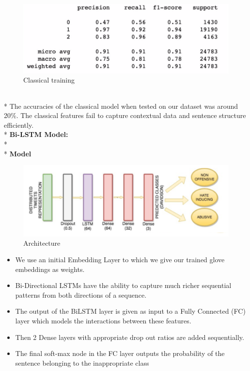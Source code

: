 \documentclass{article}[A4]
\begin{document}
\begin{figure}[!htb]
    \centering
    \includegraphics[scale=0.50]{classical.png}
    \caption{Classical training}
    \label{fig:model_res}
\end{figure}
\\*
The accuracies of the classical model when tested on our dataset was around 20\%. The classical features fail to capture contextual data and sentence structure efficiently. 
\\*
\textbf{Bi-LSTM Model:}\\*
\\* 
\textbf{Model} 
\begin{figure}[!htb]
    \centering
    \includegraphics[scale=0.50]{model.png}
    \caption{Architecture}
    \label{fig:model_res}
\end{figure}
\begin{itemize}
\item{We use an initial Embedding Layer to which we give our trained glove embeddings as weights. }
\item{Bi-Directional LSTMs have the ability to capture much richer sequential patterns from both directions of a sequence.}
\item{The output of the BiLSTM layer is given as input to a Fully Connected (FC) layer which models the interactions between these features.}
\item{Then 2 Dense layers with appropriate drop out ratios are added sequentially.}
\item{The final soft-max node in the FC layer outputs the probability of the sentence belonging to the inappropriate class}
\end{itemize}
\end{document}
